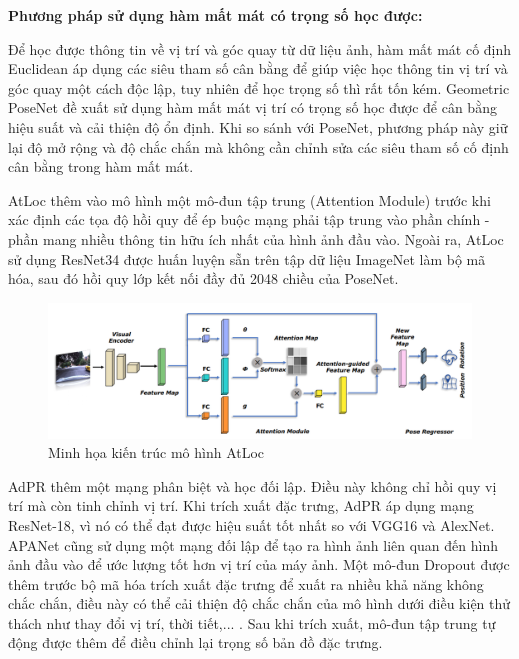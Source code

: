 \noindent\textbf{Phương pháp sử dụng hàm mất mát có trọng số học được:}

Để học được thông tin về vị trí và góc quay từ dữ liệu ảnh, hàm mất mát cố định Euclidean áp dụng các siêu tham số cân bằng để giúp việc học thông tin vị trí và góc quay một cách độc lập, tuy nhiên để học trọng số thì rất tốn kém. Geometric PoseNet \cite{kendall2017geometric} đề xuất sử dụng hàm mất mát vị trí có trọng số học được để cân bằng hiệu suất và cải thiện độ ổn định. Khi so sánh với PoseNet, phương pháp này giữ lại độ mở rộng và độ chắc chắn mà không cần chỉnh sửa các siêu tham số cố định cân bằng trong hàm mất mát.

AtLoc \cite{wang2019atloc} thêm vào mô hình một mô-đun tập trung (Attention Module) trước khi xác định các tọa độ hồi quy để ép buộc mạng phải tập trung vào phần chính - phần mang nhiều thông tin hữu ích nhất của hình ảnh đầu vào. Ngoài ra, AtLoc sử dụng ResNet34 được huấn luyện sẵn trên tập dữ liệu ImageNet làm bộ mã hóa, sau đó hồi quy lớp kết nối đầy đủ 2048 chiều của PoseNet.
\begin{figure}[H]
    \centering
    \includegraphics[width=\textwidth]{pics/Chapter2/atloc.png}
    \caption{Minh họa kiến trúc mô hình AtLoc \cite{wang2019atloc}}
\end{figure}
AdPR \cite{bui2019adversarial} thêm một mạng phân biệt và học đối lập. Điều này không chỉ hồi quy vị trí mà còn tinh chỉnh vị trí. Khi trích xuất đặc trưng, AdPR áp dụng mạng ResNet-18, vì nó có thể đạt được hiệu suất tốt nhất so với VGG16 và AlexNet. APANet \cite{chidlovskii2020adversarial} cũng sử dụng một mạng đối lập để tạo ra hình ảnh liên quan đến hình ảnh đầu vào để ước lượng tốt hơn vị trí của máy ảnh. Một mô-đun Dropout được thêm trước bộ mã hóa trích xuất đặc trưng để xuất ra nhiều khả năng không chắc chắn, điều này có thể cải thiện độ chắc chắn của mô hình dưới điều kiện thử thách như thay đổi vị trí, thời tiết,... . Sau khi trích xuất, mô-đun tập trung tự động được thêm để điều chỉnh lại trọng số bản đồ đặc trưng.
